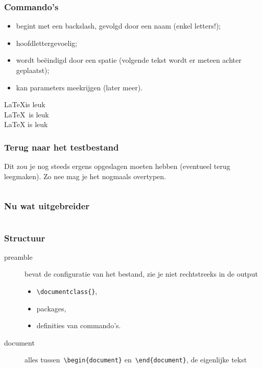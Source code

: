 \begin{frame}[fragile]
  \frametitle{Commando's}

  \begin{itemize}
	  \item begint met een backslash, gevolgd door een naam (enkel letters!);
	  \item hoofdlettergevoelig;
	  \item wordt be\"eindigd door een spatie (volgende tekst wordt er meteen achter geplaatst);
	  \item kan parameters meekrijgen (later meer).
  \end{itemize}

  \begin{LTXexample}[pos=r]
\LaTeX is leuk \\
\LaTeX~is leuk \\
\LaTeX{} is leuk
  \end{LTXexample}
\end{frame}

\begin{frame}
  \frametitle{Terug naar het testbestand}
  Dit zou je nog steeds ergens opgeslagen moeten hebben (eventueel terug leegmaken). Zo nee mag je het nogmaals overtypen.
  \inputminted{latex}{test-1.tex}
\end{frame}

\begin{frame}
  \frametitle{Nu wat uitgebreider}
  \inputminted{latex}{test-2.tex}
\end{frame}

\begin{frame}
  \frametitle{Structuur}

  \begin{description}
	\item[preamble] bevat de configuratie van het bestand, zie je niet rechtstreeks in de output
	  \begin{itemize}
      \item \texttt{\textcolor{uagreen}{\textbackslash documentclass}\{\}},
	  	\item packages,
	  	\item definities van commando's.
	  \end{itemize}
    \item[document] alles tussen~\texttt{\textcolor{uagreen}{\textbackslash begin}\{document\}} en~\texttt{\textcolor{uagreen}{\textbackslash end}\{document\}}, de eigenlijke tekst
  \end{description}
\end{frame}

